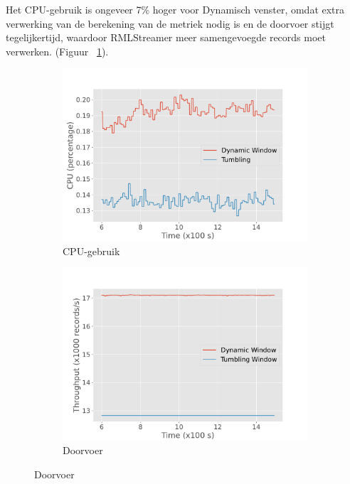 Het CPU-gebruik is ongeveer 7\%
hoger voor Dynamisch venster, omdat extra verwerking van de berekening van de metriek nodig is en 
de doorvoer stijgt tegelijkertijd, waardoor RMLStreamer meer samengevoegde records moet verwerken.
(Figuur ~\ref{fig:constant_cpu}). 

\begin{figure}[htbp]
    \begin{subfigure}[b]{0.5\columnwidth}
        \includegraphics[width=\columnwidth]{fig/constant-rate/cpu_comparison.pdf}
        \caption{CPU-gebruik}
        \label{fig:constant_cpu}
    \end{subfigure}
    \begin{subfigure}[b]{0.5\columnwidth}
        \includegraphics[width=\columnwidth]{fig/constant-rate/throughput_comparison.pdf}
        \caption{Doorvoer}

\end{subfigure}
\end{figure}
